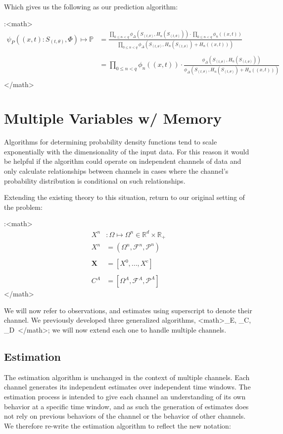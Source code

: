 \documentclass[11pt,twocolumn,titlepage]{article}
\begin{document}
Which gives us the following as our prediction algorithm:

:<math>
\begin{align}
\psi_P( (x,t) :S_{(t,\theta)}, \Phi ) \mapsto \mathbb{P} &= \frac{ \prod_{0 \le n < q} \phi_\Delta(S_{(t,\theta)}, H_n(S_{(t,\theta)})) \cdot \prod_{0 \le n < q} \phi_n((x,t)) }{ \prod_{0 \le n < q} \phi_\Delta(S_{(t,\theta)}, H_n(S_{(t,\theta)}) + H_n((x,t)) ) } 
\\
\\
&= \prod_{0 \le n < q} \phi_n((x,t)) \cdot \frac{ \phi_\Delta(S_{(t,\theta)}, H_n(S_{(t,\theta)})) }{ \phi_\Delta(S_{(t,\theta)}, H_n(S_{(t,\theta)}) + H_n((x,t)) ) }  \\
\end{align}
</math>

\section{Multiple Variables w/ Memory}
Algorithms for determining probability density functions tend to scale exponentially with the dimensionality of the input data.  For this reason it would be helpful if the algorithm could operate on independent channels of data and only calculate relationships between channels in cases where the channel's probability distribution is conditional on such relationships.

Extending the existing theory to this situation, return to our original setting of the problem:

:<math>
\begin{align}
X^n &: \Omega \mapsto \Omega^n \in \mathbb{R}^d \times \mathbb{R}_+ \\
X^n &= (\Omega^n,\mathcal{F}^n,\mathcal{P}^n) \\
\\
\mathbf{X} &= [X^0,...,X^c]   \\
\\
C^A &= [\Omega^A,\mathcal{F}^A,\mathcal{P}^A]
\end{align}
</math> 


We will now refer to observations, and estimates using superscript to denote their channel.  We previously developed three generalized algorithms, <math>\psi_E, \psi_C, \psi_D \,\!</math>; we will now extend each one to handle multiple channels.

\subsection{Estimation}
The estimation algorithm is unchanged in the context of multiple channels.  Each channel generates its independent estimates over independent time windows.  The estimation process is intended to give each channel an understanding of its own behavior at a specific time window, and as such the generation of estimates does not rely on previous behaviors of the channel or the behavior of other channels.  We therefore re-write the estimation algorithm to reflect the new notation:
\end{document}
